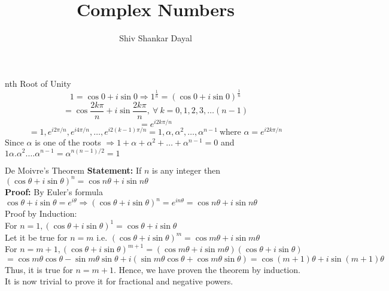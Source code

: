 \documentclass[aspectratio=169,8pt]{beamer}
\title{Complex Numbers}
\author[Shiv Shankar Dayal]{Shiv Shankar Dayal}
\begin{document}
\begin{frame}
  \titlepage
\end{frame}
\begin{frame}{nth Root of Unity}
  $$1 = \cos 0 + i\sin 0 \Rightarrow 1^{\frac{1}{n}} = (\cos 0 + i\sin 0)^{\frac{1}{n}}$$
  $$= \cos\frac{2k\pi}{n} + i\sin\frac{2k\pi}{n},~\forall~k = 0, 1,2, 3, \ldots (n - 1)$$
  $$= e^{i2k\pi/n}$$
  $$= 1, e^{i2\pi/n}, e^{i4\pi/n}, \ldots, e^{i2(k - 1)\pi/n} = 1, \alpha, \alpha^2, \ldots, \alpha^{n - 1}~\text{where~}\alpha= e^{i2k\pi/n}$$
  Since $\alpha$ is one of the roots $\Rightarrow 1 + \alpha + \alpha^2 + \ldots + \alpha^{n - 1} = 0$ and $1\alpha.\alpha^2.\ldots\alpha^{n - 1} = \alpha^{n(n - 1)/2} = 1$
\end{frame}
\begin{frame}{De Moivre's Theorem}
  \textbf{Statement:} If $n$ is any integer then $(\cos\theta + i\sin\theta)^n = \cos n\theta+ i\sin n\theta$\\
  \vspace*{0.2cm}
  \textbf{Proof:} By Euler's formula $\cos\theta + i\sin\theta = e^{i\theta} \Rightarrow (\cos\theta + i\sin\theta)^n = e^{in\theta} = \cos n\theta + i\sin n\theta$\\
  \vspace*{0.2cm}
  Proof by Induction:\\
  \vspace*{0.2cm}
  For $n = 1, (\cos\theta + i\sin\theta)^1 =\cos\theta + i\sin\theta$\\
  \vspace*{0.2cm}
  Let it be true for $n = m$ i.e. $(\cos\theta + i\sin\theta)^m = \cos m\theta+ i\sin m\theta$\\
  \vspace*{0.2cm}
  For $n = m + 1, (\cos\theta + i\sin\theta)^{m + 1} = (\cos m\theta+ i\sin m\theta)(\cos\theta + i\sin\theta)$\\
  \vspace*{0.2cm}
  $= \cos m\theta\cos\theta - \sin m\theta\sin\theta + i(\sin m\theta\cos\theta + \cos m\theta\sin\theta) = \cos(m + 1)\theta + i\sin(m + 1)\theta$\\
  \vspace*{0.2cm}
  Thus, it is true for $n = m + 1.$ Hence, we have proven the theorem by induction.\\
  \vspace*{0.2cm}
  It is now trivial to prove it for fractional and negative powers.
\end{frame}
\end{document}
